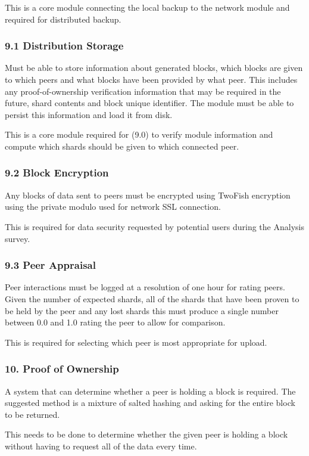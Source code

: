 \documentclass[11pt, a4paper, twocolumn, twoside]{report}
\begin{document}
This is a core module connecting the local backup to the network module and required for distributed backup.

\subsubsection{9.1 Distribution Storage}
Must be able to store information about generated blocks, which blocks are given to which peers and what blocks have been provided by what peer. This includes any proof-of-ownership verification information that may be required in the future, shard contents and block unique identifier. The module must be able to persist this information and load it from disk.

This is a core module required for (9.0) to verify module information and compute which shards should be given to which connected peer.

\subsubsection{9.2 Block Encryption}
Any blocks of data sent to peers must be encrypted using TwoFish encryption using the private modulo used for network SSL connection.

This is required for data security requested by potential users during the Analysis survey.

\subsubsection{9.3 Peer Appraisal}

Peer interactions must be logged at a resolution of one hour for rating peers. Given the number of expected shards, all of the shards that have been proven to be held by the peer and any lost shards this must produce a single number between 0.0 and 1.0 rating the peer to allow for comparison.

This is required for selecting which peer is most appropriate for upload.

\subsubsection{10. Proof of Ownership}

A system that can determine whether a peer is holding a block is required. The suggested method is a mixture of salted hashing and asking for the entire block to be returned. 

This needs to be done to determine whether the given peer is holding a block without having to request all of the data every time.
\end{document}
